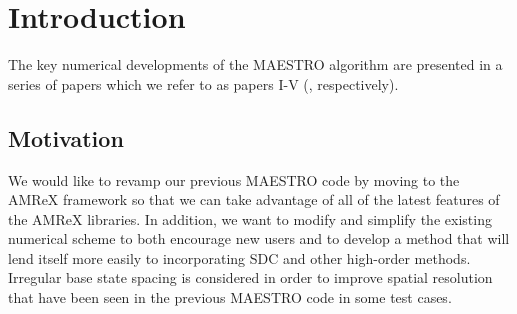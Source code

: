 \documentclass{aastex62}
\begin{document}


\section{Introduction} \label{sec:intro}

The key numerical developments of the MAESTRO algorithm are presented in a series of papers which we refer to as papers I-V (\cite{MAESTRO_I,MAESTRO_II,MAESTRO_III,MAESTRO_IV,MAESTRO_V}, respectively).



\subsection{Motivation}
We would like to revamp our previous MAESTRO code by moving to the AMReX framework
so that we can take advantage of all of the latest features of the AMReX libraries. 
In addition, we want to modify and simplify the existing numerical scheme 
to both encourage new users and to develop a method that will lend itself more 
easily to incorporating SDC and other high-order methods. 
Irregular base state spacing is considered in order to improve spatial resolution 
that have been seen in the previous MAESTRO code in some test cases.
\end{document}
